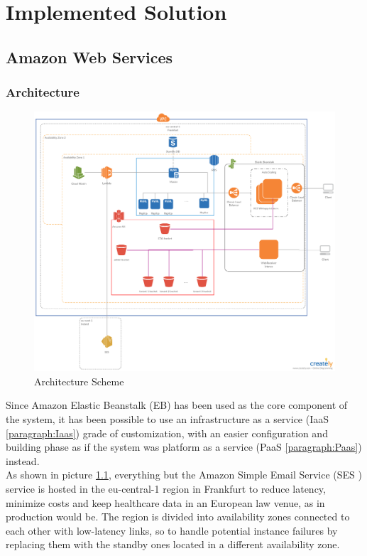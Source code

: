 \chapter{Implemented Solution}
\section{Amazon Web Services}

\subsection{Architecture}
\begin{figure}[h]
    \includegraphics[width=\textwidth]{architecture}
    \caption{Architecture Scheme}
    \label{fig:architecture}
\end{figure}
Since Amazon Elastic Beanstalk (EB) has been used as the core component of the system, it has been possible to use an infrastructure as a service (IaaS \ref{paragraph:Iaas}) grade of customization, with an easier configuration and building phase as if the system was platform as a service (PaaS \ref{paragraph:Paas}) instead.\\
As shown in picture \ref{fig:architecture}, everything but the Amazon Simple Email Service (SES \cite{AmazonSes}) service is hosted in the eu-central-1 region in Frankfurt to reduce latency, minimize costs and keep healthcare data in an European law venue, as in production would be.
The region is divided into availability zones connected to each other with low-latency links, so to handle potential instance failures by replacing them with the standby ones located in a different availability zone.\\
